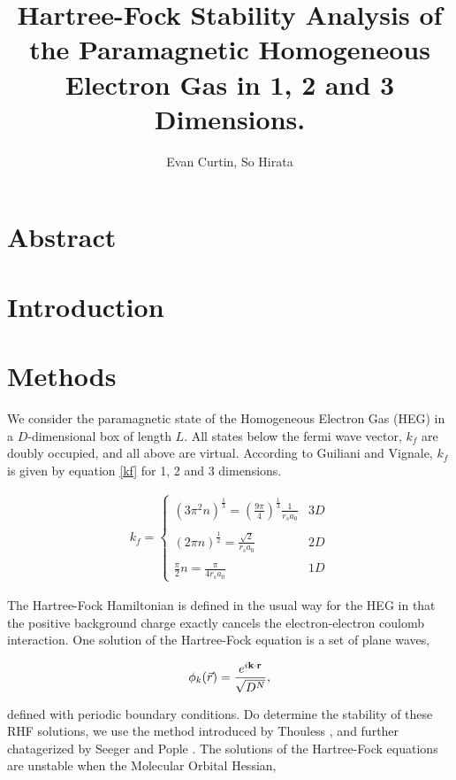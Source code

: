 \documentclass{revtex4}
\begin{document}
\title{Hartree-Fock Stability Analysis of the Paramagnetic Homogeneous Electron Gas in
1, 2 and 3 Dimensions.}
\author{Evan Curtin, So Hirata}
\maketitle

\section{Abstract}

\section{Introduction}

\section{Methods}
We consider the paramagnetic state of the Homogeneous Electron Gas (HEG) in a $D$-dimensional
box of length $L$. All states below the fermi wave vector, $k_f$ are doubly occupied, and all
above are virtual. According to Guiliani and Vignale\cite{Guiliani2005}, $k_f$ is given by equation 
\ref{kf} for 1, 2 and 3 dimensions.

\begin{eqnarray} \label{kf}
k_f
=\begin{cases} 
  (3\pi^2n)^{\frac{1}{3}} = \left(\frac{9\pi}{4}\right)^{\frac{1}{3}}\frac{1}{r_sa_0} & 3D \\ \\
  (2\pi n)^{\frac{1}{2}} = \frac{\sqrt{2}}{r_sa_0}  & 2D \\
  \\
  \frac{\pi}{2}n = \frac{\pi}{4 r_s a_0}   & 1D 
 \end{cases} 
\end{eqnarray}

The Hartree-Fock Hamiltonian  is defined in the usual way for the HEG in that the positive
background charge exactly cancels the electron-electron coulomb interaction. One solution of the 
Hartree-Fock equation is a set of plane waves, 

\begin{eqnarray} \label {planewave}
  \phi_k(\vec{r}) = \frac{ e^ {i \bf{k} \cdot \bf{r}}} {\sqrt{D^N}},  
\end{eqnarray}

defined with periodic boundary conditions\cite{Phillips2012}. Do determine the stability of these
RHF solutions, we use the method introduced by Thouless \cite{Thouless1960}, and further 
chatagerized by Seeger and Pople \cite{Seeger1977}. The solutions of the Hartree-Fock equations are 
unstable when the Molecular Orbital Hessian, 
\end{document}
